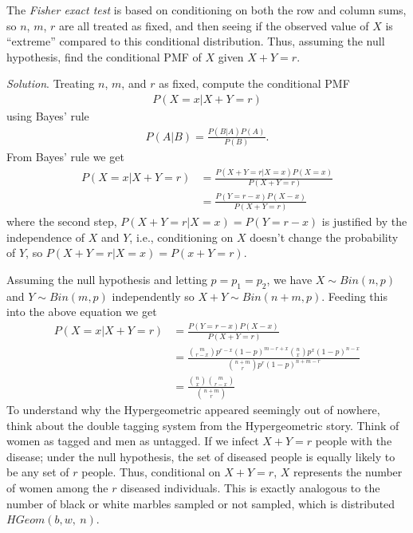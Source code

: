 The \emph{Fisher exact test} is based on conditioning on both the row
and column sums, so \(n\), \(m\), \(r\) are all treated as fixed, 
and then seeing if the observed value of \(X\) is ``extreme'' compared to
this conditional distribution.
Thus, 
assuming the null hypothesis, 
find the conditional PMF of \(X\) given \(X + Y = r\).

\emph{Solution}. 
Treating \(n\), \(m\), and \(r\) as fixed, 
compute the conditional PMF
\begin{align}
P\left( X = x | X + Y = r \right)
\end{align}
using Bayes' rule
\begin{align}
P\left( A | B \right) = \frac{P\left( B | A \right)P(A)}{P(B)}.
\end{align}
From Bayes' rule we get
\begin{align}
P\left( X = x | X + Y = r \right) &= \frac{P\left( X + Y = r | X = x \right)P(X = x)}{\ P(X + Y = r)} \\
&= \frac{P(Y = r - x)P(X - x)}{P(X + Y = r)}
\end{align}
where the second step,
\(P\left( X + Y = r | X = x \right) = P(Y = r - x)\) is justified by the independence of \(X\) and \(Y\), 
i.e., conditioning on \(X\) doesn't change the probability of \(Y\), 
so \(P\left( X + Y = r | X = x \right) = P(x + Y = r)\).

Assuming the null hypothesis and letting \(p = p_{1} = p_{2}\), 
we have \(X \sim Bin(n, p)\) and \(Y \sim Bin(m, p)\) independently so \(X + Y \sim Bin(n + m,p)\). 
Feeding this into the above equation we get
\begin{align}
P\left( X = x | X + Y = r \right) &= \frac{P(Y = r - x)P(X - x)}{\ P(X + Y = r)}\\
&= \frac{\binom{m}{r - x}p^{r - x}(1 - p)^{m - r + x}\binom{n}{x}p^{x}(1 - p)^{n - x}}{\binom{n + m}{r}p^{r}(1 - p)^{n + m - r}} \\
&= \frac{\binom{n}{x}\binom{m}{r - x}}{\binom{n + m}{r}}
\end{align}
To understand why the Hypergeometric appeared seemingly out of nowhere,
think about the double tagging system from the Hypergeometric story.
Think of women as tagged and men as untagged. 
If we infect \(X + Y = r\) people with the disease; 
under the null hypothesis, 
the set of diseased people is equally likely to be any set of \(r\) people. 
Thus,
conditional on \(X + Y = r\), 
\(X\) represents the number of women among the \(r\) diseased individuals. 
This is exactly analogous to the number of black or white marbles sampled or not sampled, 
which is distributed \(HGeom(b,w,\ n)\).%

